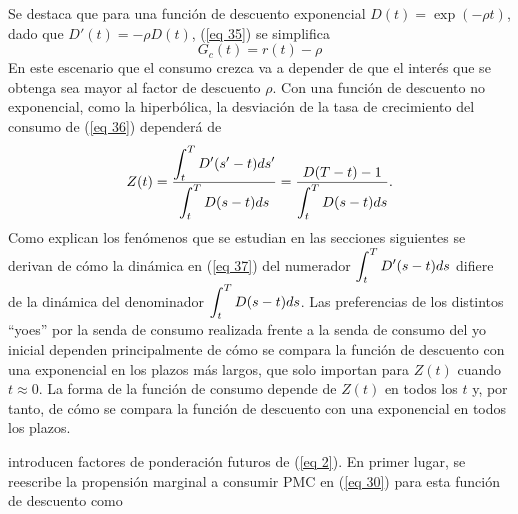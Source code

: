 Se destaca que para una función de descuento exponencial $D(t) = \exp(-\rho t)$, dado que $D'(t) = -\rho D(t)$, (\ref{eq 35}) se simplifica 
\begin{equation}
\label{eq 36}
    G_c(t)=r(t)- \rho
\end{equation}
\noindent En este escenario que el consumo crezca va a depender de que el interés que se obtenga sea mayor al factor de descuento $\rho$. Con una función de descuento no exponencial, como la hiperbólica, la desviación de la tasa de crecimiento del consumo de (\ref{eq 36}) dependerá de
\begin{equation}
\label{eq 37}
    Z(t)= \dfrac{\displaystyle \int_t^T D'(s'-t) ds'}{\displaystyle \int_t^T D(s-t) ds}= \dfrac{D(T-t)-1 }{\displaystyle \int_t^T D(s-t) ds}.
\end{equation}
Como explican \parencite{feigenbaum2021deviation} los fenómenos que se estudian en las secciones siguientes se derivan de cómo la dinámica en (\ref{eq 37}) del numerador  $\displaystyle \int_t^T D'(s-t) ds$ difiere de la dinámica del denominador $\displaystyle \int_t^T D(s-t) ds$.
%
%
Las preferencias de los distintos “yoes” por la senda de consumo realizada frente a la senda de consumo del yo inicial dependen principalmente de cómo se compara la función de descuento con una exponencial en los plazos más largos, que solo importan para $Z(t)$ cuando $t \approx 0$. La forma de la función de consumo depende de $Z(t)$ en todos los $t$ y, por tanto, de cómo se compara la función de descuento con una exponencial en todos los plazos.

\textcite{feigenbaum2021deviation} introducen factores de ponderación futuros de (\ref{eq 2}). En primer lugar, se reescribe la propensión marginal a consumir PMC en (\ref{eq 30}) para esta función de descuento como

